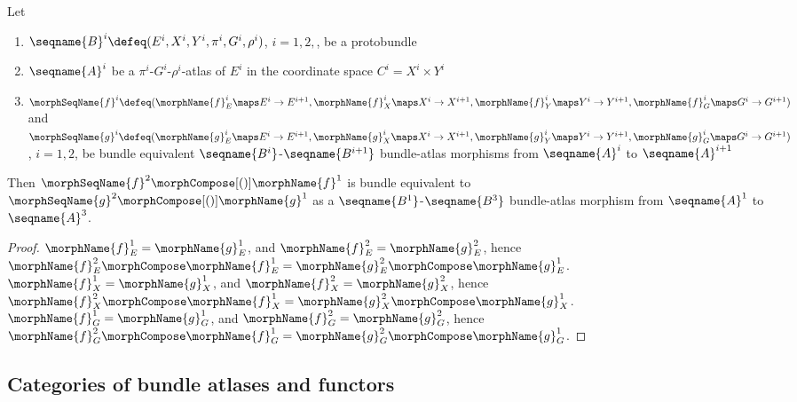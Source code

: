 \documentclass{article}
\begin{document}
\begin{lemma}
\label{lem:Bun-ATLmorphequiv}
Let
\begin{enumerate}
\item
$
  \seqname{B}^i
  \defeq
  (
    E^i,
    X^i,
    Y^i,
    \pi^i,
    G^i,
    \rho^i
  )
$, $i=1,2,$, be a protobundle
\item
$\seqname{A}^i$ be a $\pi^i$-$G^i$-$\rho^i$-atlas of $E^i$ in the coordinate space
$C^i = X^i \times Y^i$
\item
$
  \morphSeqName{f}^i \defeq
  (
    \morphName{f}^i_E \maps E^i \to E^{i+1},
    \morphName{f}^i_X \maps X^i \to X^{i+1},
    \morphName{f}^i_Y \maps Y^i \to Y^{i+1},
    \morphName{f}^i_G \maps G^i \to G^{i+1}
  )
$
and
$
  \morphSeqName{g}^i \defeq
  (
    \morphName{g}^i_E \maps E^i \to E^{i+1},
    \morphName{g}^i_X \maps X^i \to X^{i+1},
    \morphName{g}^i_Y \maps Y^i \to Y^{i+1},
    \morphName{g}^i_G \maps G^i \to G^{i+1}
  )
$,
$i=1,2$,
be bundle equivalent $\seqname{B^i}$-$\seqname{B^{i+1}}$ bundle-atlas
morphisms from $\seqname{A}^i$ to $\seqname{A}^{i+1}$
\end{enumerate}

Then $\morphSeqName{f}^2 \morphCompose[()] \morphName{f}^1$ is bundle
equivalent to $\morphSeqName{g}^2 \morphCompose[()] \morphName{g}^1$ as a
$\seqname{B^1}$-$\seqname{B^3}$ bundle-atlas morphism from
$\seqname{A}^1$ to $\seqname{A}^3$.

\begin{proof}
$\morphName{f}^1_E = \morphName{g}^1_E$, and
$\morphName{f}^2_E = \morphName{g}^2_E$, hence
$
  \morphName{f}^2_E \morphCompose \morphName{f}^1_E =
  \morphName{g}^2_E \morphCompose \morphName{g}^1_E
$.
$\morphName{f}^1_X = \morphName{g}^1_X$, and
$\morphName{f}^2_X = \morphName{g}^2_X$, hence
$
  \morphName{f}^2_X \morphCompose \morphName{f}^1_X =
  \morphName{g}^2_X \morphCompose \morphName{g}^1_X
$.
$\morphName{f}^1_G = \morphName{g}^1_G$, and
$\morphName{f}^2_G = \morphName{g}^2_G$, hence
$
  \morphName{f}^2_G \morphCompose \morphName{f}^1_G =
  \morphName{g}^2_G \morphCompose \morphName{g}^1_G
$.
\end{proof}
\end{lemma}

\subsection{Categories of bundle atlases and functors}
\label{sub:Bun-cat}
\end{document}
